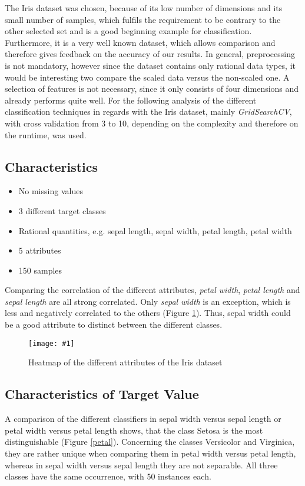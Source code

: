 \documentclass{article}
\newcommand{\size}{0.8\textwidth}
\newcommand{\image}[3]{
\begin{figure}
\begin{center}
\texttt{[image: \#1]}
\caption{#2}
#3
\end{center}
\end{figure}
}
\begin{document}
The Iris dataset was chosen, because of its low number of dimensions and its small number of samples, which fulfils the requirement to be contrary to the other selected set and is a good beginning example for classification. Furthermore, it is a very well known dataset, which allows comparison and therefore gives feedback on the accuracy of our results. In general, preprocessing is not mandatory, however since the dataset contains only rational data types, it would be interesting two compare the scaled data versus the non-scaled one. A selection of features is not necessary, since it only consists of four dimensions and already performs quite well. For the following analysis of the different classification techniques in regards with the Iris dataset, mainly \textit{GridSearchCV}, with cross validation from 3 to 10, depending on the complexity and therefore on the runtime, was used. 

\subsection{Characteristics}

\begin{itemize}
\item No missing values
\item 3 different target classes
\item Rational quantities, e.g. sepal length, sepal width, petal length, petal width
\item 5 attributes
\item 150 samples
\end{itemize}

Comparing the correlation of the different attributes, \textit{petal width}, \textit{petal length} and \textit{sepal length} are all strong correlated. Only \textit{sepal width} is an exception, which is less and negatively correlated to the others (Figure \ref{fig:heat}). Thus, sepal width could be a good attribute to distinct between the different classes.

\image{plots/heatmap.png}{Heatmap of the different attributes of the Iris dataset}{\label{fig:heat}}

\subsection{Characteristics of Target Value}
A comparison of the different classifiers in sepal width versus sepal length or petal width versus petal length shows, that the class Setosa is the most distinguishable (Figure \ref{petal}). Concerning the classes Versicolor and Virginica, they are rather unique when comparing them in petal width versus petal length, whereas in sepal width versus sepal length they are not separable. All three classes have the same occurrence, with 50 instances each.
\end{document}
